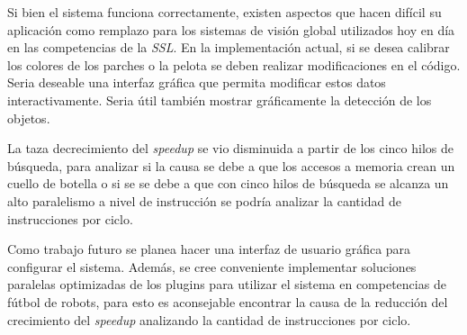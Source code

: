 \label{trabajosFuturos}

Si bien el sistema funciona correctamente, existen aspectos que hacen difícil su
aplicación como remplazo para los sistemas de visión global utilizados hoy en
día en las competencias de la \emph{SSL}. En la implementación actual, si se
desea calibrar los colores de los parches o la pelota se deben realizar
modificaciones en el código. Seria deseable una interfaz gráfica que permita
modificar estos datos interactivamente. Seria útil también mostrar gráficamente
la detección de los objetos.

La taza decrecimiento del \emph{speedup} se vio disminuida a partir de los cinco
hilos de búsqueda, para analizar si la causa se debe a que los accesos a memoria
crean un cuello de botella o si se se debe a que con cinco hilos de búsqueda se
alcanza un alto paralelismo a nivel de instrucción se podría analizar la
cantidad de instrucciones por ciclo.

Como trabajo futuro se planea hacer una interfaz de usuario gráfica para
configurar el sistema. Además, se cree conveniente implementar soluciones
paralelas optimizadas de los plugins para utilizar el sistema en competencias de
fútbol de robots, para esto es aconsejable encontrar la causa de la reducción
del crecimiento del \emph{speedup} analizando la cantidad de instrucciones por
ciclo.
